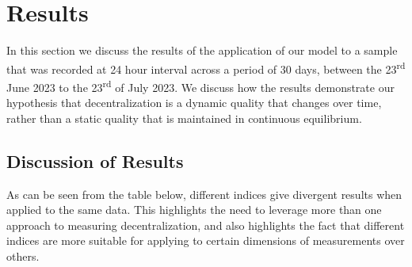 \documentclass[conference]{IEEEtran}
\begin{document}
\section{Results}

In this section we discuss the results of the application of our model to a sample that was recorded at 24 hour interval across a period of 30 days, between the 23\textsuperscript{rd} June 2023 to the 23\textsuperscript{rd} of July 2023.  We discuss how the results demonstrate our hypothesis that decentralization is a dynamic quality that changes over time, rather than a static quality that is maintained in continuous equilibrium.

%     
% 


\subsection{Discussion of Results}

As can be seen from the table below, different indices give divergent results when applied to the same data.  This highlights the need to leverage more than one approach to measuring decentralization, and also highlights the fact that different indices are more suitable for applying to certain dimensions of measurements over others.
\end{document}
